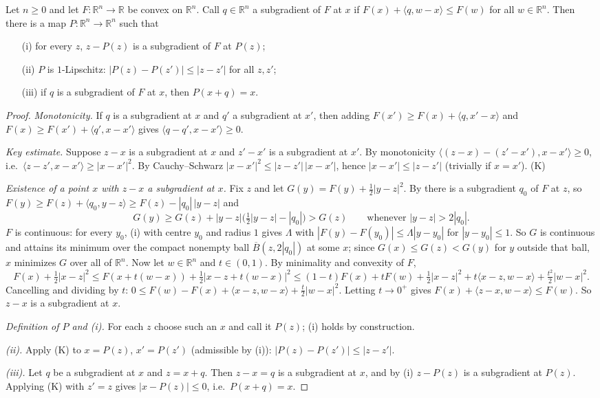 \begin{lemma}
Let $n\ge0$ and let $F:\mathbb R^n\to\mathbb R$ be convex on $\mathbb R^n$. Call $q\in\mathbb R^n$ a subgradient of $F$ at $x$ if $F(x)+\langle q,w-x\rangle\le F(w)$ for all $w\in\mathbb R^n$. Then there is a map $P:\mathbb R^n\to\mathbb R^n$ such that
\begin{enumerate}
\item[(i)] for every $z$, $z-P(z)$ is a subgradient of $F$ at $P(z)$;
\item[(ii)] $P$ is $1$-Lipschitz: $|P(z)-P(z')|\le|z-z'|$ for all $z,z'$;
\item[(iii)] if $q$ is a subgradient of $F$ at $x$, then $P(x+q)=x$.
\end{enumerate}
\end{lemma}
\begin{proof}
\emph{Monotonicity.} If $q$ is a subgradient at $x$ and $q'$ a subgradient at $x'$, then adding $F(x')\ge F(x)+\langle q,x'-x\rangle$ and $F(x)\ge F(x')+\langle q',x-x'\rangle$ gives $\langle q-q',x-x'\rangle\ge0$.

\emph{Key estimate.} Suppose $z-x$ is a subgradient at $x$ and $z'-x'$ is a subgradient at $x'$. By monotonicity $\langle (z-x)-(z'-x'),x-x'\rangle\ge0$, i.e.\ $\langle z-z',x-x'\rangle\ge|x-x'|^2$. By Cauchy--Schwarz $|x-x'|^2\le|z-z'|\,|x-x'|$, hence $|x-x'|\le|z-z'|$ (trivially if $x=x'$). \hfill(K)

\emph{Existence of a point $x$ with $z-x$ a subgradient at $x$.} Fix $z$ and let $G(y)=F(y)+\frac12|y-z|^2$. By  there is a subgradient $q_0$ of $F$ at $z$, so $F(y)\ge F(z)+\langle q_0,y-z\rangle\ge F(z)-|q_0|\,|y-z|$ and
\[
G(y)\ge G(z)+|y-z|\bigl(\tfrac12|y-z|-|q_0|\bigr)>G(z)\qquad\text{whenever }|y-z|>2|q_0| .
\]
$F$ is continuous: for every $y_0$, (i) with centre $y_0$ and radius $1$ gives $\Lambda$ with $|F(y)-F(y_0)|\le\Lambda|y-y_0|$ for $|y-y_0|\le1$. So $G$ is continuous and attains its minimum over the compact nonempty ball $\overline B(z,2|q_0|)$ at some $x$; since $G(x)\le G(z)<G(y)$ for $y$ outside that ball, $x$ minimizes $G$ over all of $\mathbb R^n$. Now let $w\in\mathbb R^n$ and $t\in(0,1)$. By minimality and convexity of $F$,
\[
F(x)+\tfrac12|x-z|^2\le F(x+t(w-x))+\tfrac12|x-z+t(w-x)|^2\le(1-t)F(x)+tF(w)+\tfrac12|x-z|^2+t\langle x-z,w-x\rangle+\tfrac{t^2}2|w-x|^2 .
\]
Cancelling and dividing by $t$: $0\le F(w)-F(x)+\langle x-z,w-x\rangle+\frac t2|w-x|^2$. Letting $t\to0^+$ gives $F(x)+\langle z-x,w-x\rangle\le F(w)$. So $z-x$ is a subgradient at $x$.

\emph{Definition of $P$ and (i).} For each $z$ choose such an $x$ and call it $P(z)$; (i) holds by construction.

\emph{(ii).} Apply (K) to $x=P(z)$, $x'=P(z')$ (admissible by (i)): $|P(z)-P(z')|\le|z-z'|$.

\emph{(iii).} Let $q$ be a subgradient at $x$ and $z=x+q$. Then $z-x=q$ is a subgradient at $x$, and by (i) $z-P(z)$ is a subgradient at $P(z)$. Applying (K) with $z'=z$ gives $|x-P(z)|\le0$, i.e.\ $P(x+q)=x$.
\end{proof}
